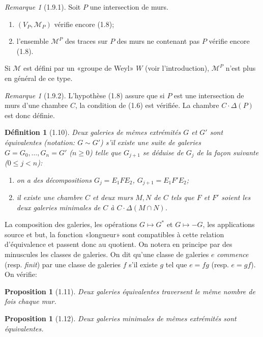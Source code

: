 \documentclass[12pt]{article}
\newtheorem{proposition}[theoreme]{Proposition}
\newtheorem{definition}[theoreme]{Définition}
\theoremstyle{remark}
\newtheorem{remarque}[theoreme]{Remarque}
\begin{document}
\begin{remarque}[1.9.1]
Soit $P$ une intersection de murs.
\begin{enumerate}
\item[(i)] $(V_P, \mathcal{M}_P)$ vérifie encore (1.8);
\item[(ii)] l'ensemble $\mathcal{M}^P$ des traces sur $P$ des murs ne contenant pas $P$ vérifie encore (1.8).
\end{enumerate}
Si $\mathcal{M}$ est défini par un «groupe de Weyl» $W$ (voir l'introduction), $\mathcal{M}^P$ n'est plus en général de ce type.
\end{remarque}

\begin{remarque}[1.9.2]
L'hypothèse (1.8) assure que si $P$ est une intersection de murs d'une chambre $C$, la condition de (1.6) est vérifiée. La chambre $C \cdot \Delta(P)$ est donc définie.
\end{remarque}

\begin{definition}[1.10]
Deux galeries de mêmes extrémités $G$ et $G'$ sont \emph{équivalentes} (notation: $G \sim G'$) s'il existe une suite de galeries $G = G_0, \ldots, G_n = G'$ ($n \geq 0$) telle que $G_{j+1}$ se déduise de $G_j$ de la façon suivante ($0 \leq j < n$):
\begin{enumerate}
\item[a)] on a des décompositions $G_j = E_1 F E_2$, $G_{j+1} = E_1 F' E_2$;
\item[b)] il existe une chambre $C$ et deux murs $M, N$ de $C$ tels que $F$ et $F'$ soient les deux galeries minimales de $C$ à $C \cdot \Delta(M \cap N)$.
\end{enumerate}
\end{definition}

La composition des galeries, les opérations $G \mapsto G^*$ et $G \mapsto -G$, les applications source et but, la fonction «longueur» sont compatibles à cette relation d'équivalence et passent donc au quotient. On notera en principe par des minuscules les classes de galeries. On dit qu'une classe de galeries $e$ \emph{commence} (resp. \emph{finit}) par une classe de galeries $f$ s'il existe $g$ tel que $e = fg$ (resp. $e = gf$). On vérifie:

\begin{proposition}[1.11]
Deux galeries équivalentes traversent le même nombre de fois chaque mur.
\end{proposition}

\begin{proposition}[1.12]
Deux galeries minimales de mêmes extrémités sont équivalentes.
\end{proposition}
\end{document}
